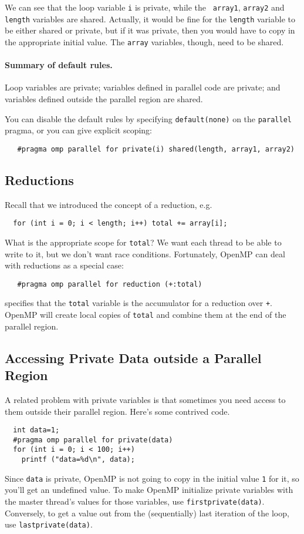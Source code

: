 We can see that the loop variable {\tt i} is private, while the {\tt
  array1}, {\tt array2} and {\tt length} variables are shared.
Actually, it would be fine for the {\tt length} variable to be either
shared or private, but if it was private, then you would have to copy
in the appropriate initial value. The {\tt array} variables, though, 
need to be shared.

\paragraph{Summary of default rules.} Loop variables are private; 
variables defined in parallel code are private; and variables defined
outside the parallel region are shared.

You can disable the default rules by specifying {\tt default(none)}
on the {\tt parallel} pragma, or you can give explicit scoping:

\verb+   #pragma omp parallel for private(i) shared(length, array1, array2)+

\subsection*{Reductions}
Recall that we introduced the concept of a reduction, e.g.
{\small
\begin{verbatim}
  for (int i = 0; i < length; i++) total += array[i];
\end{verbatim}
}
What is the appropriate scope for {\tt total}? We want each thread
to be able to write to it, but we don't want race conditions.
Fortunately, OpenMP can deal with reductions as a special case:

\verb!   #pragma omp parallel for reduction (+:total)!

\noindent
specifies that the {\tt total} variable is the accumulator for a
reduction over {\tt +}. OpenMP will create local copies of {\tt total} and 
combine them at the end of the parallel region.

\subsection*{Accessing Private Data outside a Parallel Region}
A related problem with private variables is that sometimes you need 
access to them outside their parallel region. Here's some contrived code.

{\small
\begin{verbatim}
  int data=1;
  #pragma omp parallel for private(data)
  for (int i = 0; i < 100; i++)
    printf ("data=%d\n", data);
\end{verbatim}
}
Since {\tt data} is private, OpenMP is not going to copy in the
initial value {\tt 1} for it, so you'll get an undefined value.  To
make OpenMP initialize private variables with the master thread's
values for those variables, use {\tt firstprivate(data)}.  Conversely,
to get a value out from the (sequentially) last iteration of the loop,
use {\tt lastprivate(data)}.

